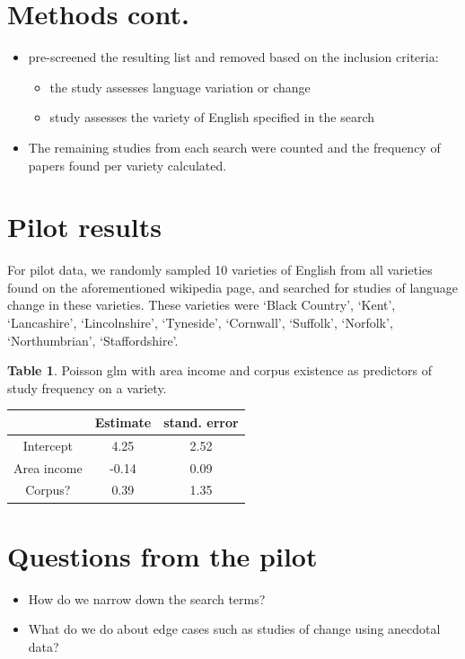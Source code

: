 \documentclass[a0paper,fleqn]{betterposter}
\begin{document}
{
	\section{Methods cont.}	
\begin{itemize}
	\item pre-screened the resulting list and removed based on the inclusion criteria:
	\begin{itemize}
		\item the study assesses language variation or change
		\item study assesses the variety of English specified in the search
	\end{itemize}
	\item The remaining studies from each search were counted and the frequency of papers found per variety calculated.

\end{itemize}



\section{Pilot results}

For pilot data, we randomly sampled 10 varieties of English from all varieties found on the aforementioned wikipedia page, and searched for studies of language change in these varieties. These varieties were `Black Country', `Kent', `Lancashire', `Lincolnshire', `Tyneside', `Cornwall', `Suffolk', `Norfolk', `Northumbrian', `Staffordshire'.

\vspace{1cm}

\textbf{Table 1}. Poisson glm with area income and corpus existence as predictors of study frequency on a variety.

\begin{tabular}{ c c c }
	& Estimate & stand. error\\
	\hline
	Intercept & 4.25 & 2.52	\\
	Area income & -0.14 & 0.09\\
	Corpus? & 0.39 & 1.35 \\
\hline
\end{tabular}

\section{Questions from the pilot}
\begin{itemize}
	\item How do we narrow down the search terms?
	\item What do we do about edge cases such as studies of change using anecdotal data?
\end{itemize}



}
\end{document}
